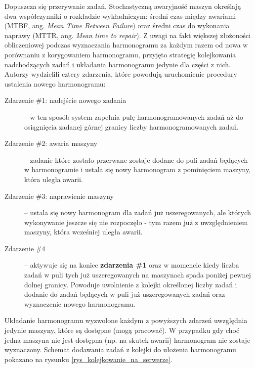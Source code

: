 \documentclass[printmode,oneside]{mgr}
\begin{document}
Dopuszcza się przerywanie zadań. Stochastyczną awaryjność maszyn określają dwa współczynniki o rozkładzie wykładniczym: średni czas między awariami (MTBF, ang. \emph{Mean Time Between Failure}) oraz średni czas do wykonania naprawy (MTTR, ang. \emph{Mean time to repair}). Z uwagi na fakt większej złożoności obliczeniowej podczas wyznaczania harmonogramu za każdym razem od nowa w porównaniu z korygowaniem harmonogramu, przyjęto strategię kolejkowania nadchodzących zadań i układania harmonogramu jedynie dla części z nich. Autorzy wydzielili cztery zdarzenia, które powodują uruchomienie procedury ustalenia nowego harmonogramu:
\begin{description}
    \item[Zdarzenie \#1: nadejście nowego zadania] -- w ten sposób system zapełnia pulę harmonogramowanych zadań aż do osiągnięcia zadanej górnej granicy liczby harmonogramowanych zadań.
    \item[Zdarzenie \#2: awaria maszyny] -- zadanie które zostało przerwane zostaje dodane do puli zadań będących w harmonogramie i ustala się nowy harmonogram z pominięciem maszyny, która uległa awarii.
    \item[Zdarzenie \#3: naprawienie maszyny] -- ustala się nowy harmonogram dla zadań już uszeregowanych, ale których wykonywanie jeszcze się nie rozpoczęło - tym razem już z uwzględnieniem maszyny, która wcześniej uległa awarii.
    \item[Zdarzenie \#4] -- aktywuje się na koniec \textbf{zdarzenia \#1} oraz w momencie kiedy liczba zadań w puli tych już uszeregowanych na maszynach spada poniżej pewnej dolnej granicy. Powoduje uwolnienie z kolejki określonej liczby zadań i dodanie do zadań będących w puli już uszeregowanych zadań oraz wyznaczenie nowego harmonogramu.
\end{description}
Układanie harmonogramu wyzwolone każdym z powyższych zdarzeń uwzględnia jedynie maszyny, które są dostępne (mogą pracować). W przypadku gdy choć jedna maszyna nie jest dostępna (np. na skutek awarii) harmonogram nie zostaje wyznaczony. Schemat dodawania zadań z kolejki do ułożenia harmonogramu pokazano na rysunku \ref{rys_kolejkowanie_na_serwerze}.
\end{document}
